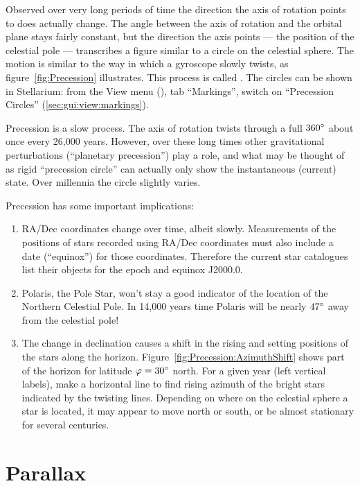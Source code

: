 Observed over very long periods of time the direction the axis of
rotation points to does actually change. The angle between the axis of
rotation and the orbital plane stays fairly constant, but the
direction the axis points --- the position of the celestial pole ---
transcribes a figure similar to a circle on the celestial sphere. The motion
is similar to the way in which a gyroscope slowly twists, as
figure~\ref{fig:Precession} illustrates. This process is called
. The circles can be shown in Stellarium: from
the View menu (), tab ``Markings'', switch on ``Precession
Circles'' (\ref{sec:gui:view:markings}).

Precession is a slow process. The axis of rotation twists through a
full $360\degree$ about once every 26,000 years. However, over these
long times other gravitational perturbations (``planetary
precession'') play a role, and what may be thought of as rigid
``precession circle'' can actually only show the instantaneous
(current) state. Over millennia the circle slightly varies.

Precession has some important implications:

\begin{enumerate}
\item RA/Dec coordinates change over time, albeit slowly. Measurements
  of the positions of stars recorded using RA/Dec coordinates must
  also include a date (``equinox'') for those coordinates. Therefore
  the current star catalogues list their objects for the epoch and
  equinox J2000.0.
\item Polaris, the Pole Star, won't stay a good indicator of the
  location of the Northern Celestial Pole. In 14,000 years time
  Polaris will be nearly $47\degree$ away from the celestial pole!
\item The change in declination causes a shift in the rising and
  setting positions of the stars along the
  horizon. Figure~\ref{fig:Precession:AzimuthShift} shows part of the
  horizon for latitude $\varphi=30\degree$ north. For a given year
  (left vertical labels), make a horizontal line to find rising
  azimuth of the bright stars indicated by the twisting
  lines. Depending on where on the celestial sphere a star is located,
  it may appear to move north or south, or be almost stationary for
  several centuries.
\end{enumerate}


\section{Parallax}
\label{sec:Concepts:Parallax}


